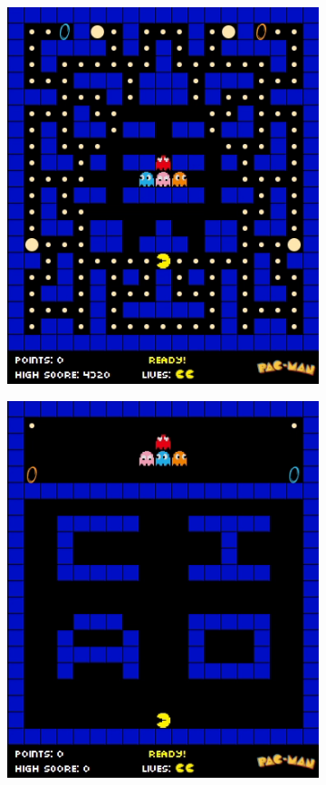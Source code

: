 \documentclass[12pt,a4paper]{report}
\begin{document}
\begin{figure}[hb!]
\begin{subfigure}{.32\textwidth}
  \includegraphics[width=.95\linewidth]{maze3}
  \caption{}
  \label{fig:snap2}
\end{subfigure}%
\begin{subfigure}{.32\textwidth}
  \centering
  \includegraphics[width=.95\linewidth]{maze4}

\end{subfigure}
\end{figure}
\end{document}
